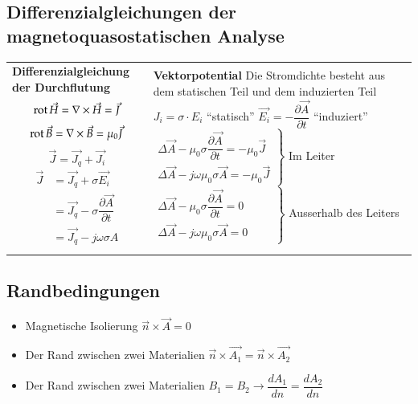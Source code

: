 \subsection{Differenzialgleichungen der magnetoquasostatischen Analyse}
\begin{tabular}{|p{} |p{}|}
	\hline
	\textbf{Differenzialgleichung der Durchflutung}\newline
	\[\operatorname{rot} \vec{H}=\nabla \times \vec{H}=\vec{J}\]
	\[\operatorname{rot} \vec{B}=\nabla \times \vec{B}=\mu_{0}\vec{J}\] \vspace{1cm} \[\vec{J} = \vec{J_q} + \vec{J_i}\] 
	{\begin{align*}
		\vec{J} &= \vec{J_q} + \sigma\vec{E_i} \\
		&= \vec{J_q} -\sigma\dfrac{\partial\vec{A}}{\partial t}\\
		&= \vec{J_q} - j\omega\sigma A
	\end{align*}} \vspace{-1cm}&
	\textbf{Vektorpotential}\newline
	Die Stromdichte besteht aus dem statischen Teil und dem induzierten Teil\newline
	$J_i=\sigma \cdot E_i $ \qquad``statisch''\newline
	$\vec{E_i}=-\dfrac{\partial \vec{A}}{\partial t}$ \qquad ``induziert''\newline \newline
	$ \left. \begin{array}{c} \Delta\vec{A}-\mu_{0}\sigma \dfrac{\partial \vec{A}}{\partial t}=-\mu_{0}\vec{J}\\\Delta\vec{A}-j\omega\mu_{0}\sigma\vec{A}=-\mu_{0}\vec{J} \end{array} \right\}$ Im Leiter\newline \newline \newline 
		$ \left. \begin{array}{c} \Delta\vec{A}-\mu_{0}\sigma \dfrac{\partial \vec{A}}{\partial t}=0\\\Delta\vec{A}-j\omega\mu_{0}\sigma\vec{A}=0 \end{array} \qquad \right\}$ Ausserhalb des Leiters\\
		& \\
	\hline
\end{tabular}
\subsection{Randbedingungen}
\begin{itemize}
	\item Magnetische Isolierung $\vec{n} \times \vec{A} =0$
	\item Der Rand zwischen zwei Materialien $\vec{n} \times \vec{A_{1}}=\vec{n} \times \vec{A_{2}}$
	\item Der Rand zwischen zwei Materialien $B_{1}=B_{2} \rightarrow \dfrac{dA_{1}}{d n}=\dfrac{dA_{2}}{d n} $
\end{itemize}

